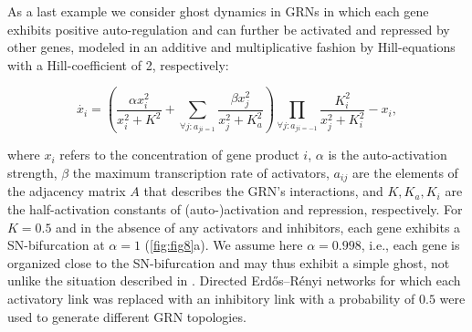 \documentclass{article}
\theoremstyle{definition}
\begin{document}
\begin{refsection}
As a last example we consider ghost dynamics in GRNs in which each gene exhibits positive auto-regulation and can further be activated and repressed by other genes, modeled in an additive and multiplicative fashion by Hill-equations \cite{Alon2019} with a Hill-coefficient of 2, respectively:

\begin{equation}
    \dot{x_i} = (\frac{\alpha x_i^2}{x_i^2+K^2} + \sum_{\forall j: a_{ji=1}} \frac{\beta x_j^2}{x_j^2+K_a^2})\prod_{\forall j: a_{ji=-1}}\frac{K_i^2}{x_j^2+K_i^2} - x_i\label{eq:GRN},
\end{equation}

where $x_i$ refers to the concentration of gene product $i$, $\alpha$ is the auto-activation strength, $\beta$ the maximum transcription rate of activators, $a_{ij}$ are the elements of the adjacency matrix $A$ that describes the GRN's interactions, and $K,K_a,K_i$ are the half-activation constants of (auto-)activation and repression, respectively. For $K=0.5$ and in the absence of any activators and inhibitors, each gene exhibits a SN-bifurcation at $\alpha=1$ (\autoref{fig:fig8}a). We assume here $\alpha=0.998$, i.e., each gene is organized close to the SN-bifurcation and may thus exhibit a simple ghost, not unlike the situation described in \cite{Farjami_2021}. Directed Erd\H{o}s--R\'enyi networks for which each activatory link was replaced with an inhibitory link with a probability of $0.5$ were used to generate different GRN topologies. 


\end{refsection}
\end{document}
